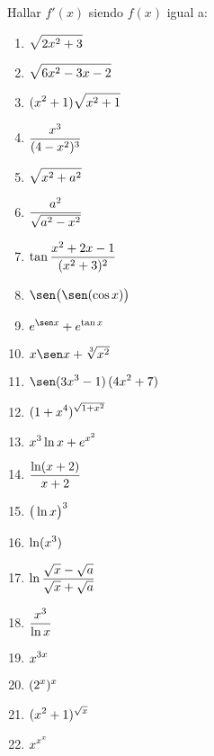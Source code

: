 \item Hallar $f'(x)$ siendo $f(x)$ igual a:
\begin{multicols}{2}
\begin{enumerate}
    \item $\displaystyle \sqrt{2x^2+3}$
    \item $\displaystyle \sqrt{6x^2-3x-2}$
    \item $\displaystyle (x^2+1)\sqrt{x^2+1}$
    \item $\displaystyle \frac{x^3}{(4-x^2)^3}$
    \item $\displaystyle \sqrt{x^2+a^2}$
    \item $\displaystyle \frac{a^2}{\sqrt{a^2-x^2}}$
    \item $\displaystyle \tan \frac{x^2+2x-1}{(x^2+3)^2}$
    \item $\D \sen\big(\sen(\cos x)\big)$
    \item $\D e^{\sen x}+e^{\tan x}$
    \item $x \sen x+\sqrt[3]{x^2}$
    \item $\D \sen(3x^3-1) \, (4x^2+7)$
    \item $\displaystyle (1+x^4)^{\sqrt{1+x^2}}$
    \item $\displaystyle x^3\ln x+e^{x^2}$
    \item $\displaystyle \frac{\ln(x+2)}{x+2}$
    \item $\displaystyle \big(\ln x\big)^3$
    \item $\displaystyle \ln (x^3)$
    \item $\displaystyle \ln \frac{\sqrt x-\sqrt a}{\sqrt x+\sqrt a}$
    \item $\displaystyle \frac{x^3}{\ln x}$
    \item $\displaystyle x^{3x}$
    \item $\displaystyle (2^x)^x$
    \item $\displaystyle (x^2+1)^{\sqrt x}$
    \item $\displaystyle x^{x^x}$
\end{enumerate}
\end{multicols}
